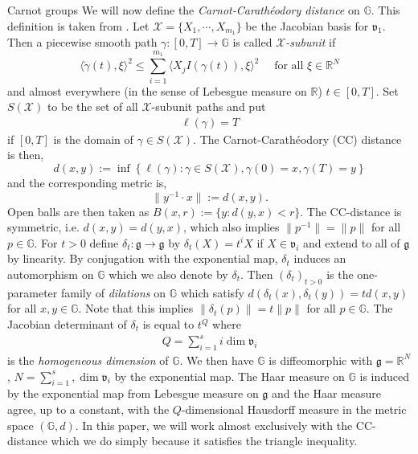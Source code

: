 \documentclass[12pt,a4paper,reqno]{amsart}
\newcommand{\g}{\mathfrak{g}}
\newcommand{\vf}{\mathfrak{v}}
\newcommand{\R}{\mathbb{R}}
\newcommand{\G}{\mathbb{G}}
\numberwithin{equation}{section}
\theoremstyle{definition}
\begin{document}
\begin{subsection}{Carnot groups}
We will now define the \textit{Carnot-Carath\'{e}odory distance} on $\G$. This definition is taken from \cite[Definition 5.2.2]{BLU}. Let $\mathcal{X} = \{X_1,\cdots, X_{m_1}\}$ be the Jacobian basis for $\vf_1$. Then a piecewise smooth path $\gamma : [0,T] \rightarrow \G$ is called \textit{$\mathcal{X}$-subunit} if \begin{equation}\label{subunit}
    \langle \dot{\gamma}(t) ,\xi \rangle^2 \leq \sum_{i=1}^{m_1} \langle X_jI(\gamma(t)), \xi \rangle^2 \quad \text{ for all }\xi \in \R^N
\end{equation}
and almost everywhere (in the sense of Lebesgue measure on $\R$) $t \in [0,T]$. Set $S(\mathcal{X})$ to be the set of all $\mathcal{X}$-subunit paths and put \begin{align*}
    \ell(\gamma) = T
\end{align*}
if $[0,T]$ is the domain of $\gamma \in S(\mathcal{X})$. The Carnot-Carath\'{e}odory (CC) distance is then, \begin{equation}\label{cc-distance}
d(x,y) := \inf \left\{ \ell(\gamma): \gamma \in S(\mathcal{X}), \gamma(0) = x, \gamma(T)= y\right\}
\end{equation}
and the corresponding metric is, \begin{equation}\label{cc-metric}
 \| y^{-1}\cdot x\| := d(x,y).
\end{equation}
Open balls are then taken as $B(x,r) := \{y : d(y,x) < r\}$. The CC-distance is symmetric, i.e. $d(x,y) = d(y,x)$, which also implies $\| p^{-1}\| = \| p\|$ for all $p \in \G$. For $t > 0$ define $\delta_t : \g \rightarrow \g$ by $\delta_t(X) = t^i X$ if $X \in \vf_i$ and extend to all of $\g$ by linearity. By conjugation with the exponential map, $\delta_t$ induces an automorphism on $\G$ which we also denote by $\delta_t$. Then $(\delta_t)_{t>0}$ is the one-parameter family of \textit{dilations} on $\G$ which satisfy $d(\delta_t(x),\delta_t(y)) = td(x,y)$ for all $x,y \in \G$. Note that this implies $\| \delta_t(p)\| = t\|p\|$ for all $p\in \G$. The Jacobian determinant of $\delta_t$ is equal to $t^Q$ where \begin{align}
Q = \sum_{i=1}^s i \dim \vf_i
\end{align}
is the \textit{homogeneous dimension} of $\G$. We then have $\G$ is diffeomorphic with $\g = \R^N$, $N = \sum_{i=1}^s, \dim \vf_i$ by the exponential map. The Haar measure on $\G$ is induced by the exponential map from Lebesgue measure on $\g$ and the Haar measure agree, up to a constant, with the $Q$-dimensional Hausdorff measure in the metric space $(\G, d)$. In this paper, we will work almost exclusively with the CC-distance which we do simply because it satisfies the triangle inequality.


\end{subsection}
\end{document}
